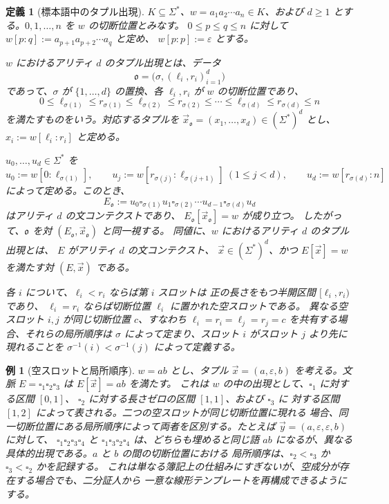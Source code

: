\documentclass[11pt,a4paper]{ltjsarticle}
\newtheorem{definition}[theorem]{定義}
\newtheorem{example}[theorem]{例}
\theoremstyle{remark}
\newcommand{\tuple}[1]{\vec{#1}}
\newcommand{\blank}{\square}
\newcommand{\eps}{\varepsilon}
\begin{document}
\begin{definition}[標本語中のタプル出現]
\label{def:tuple-occurrence}
\(K\subseteq\Sigma^*\)、\(w=a_1a_2\cdots a_n\in K\)、および
\(d\ge1\) とする。\(0,1,\ldots,n\) を \(w\) の切断位置とみなす。
\(0\le p\le q\le n\) に対して
\(w[p:q]:=a_{p+1}a_{p+2}\cdots a_q\) と定め、
\(w[p:p]:=\eps\) とする。

\(w\) における\emph{アリティ \(d\) のタプル出現}とは、データ
\[
  \mathfrak o=\bigl(\sigma,(\ell_i,r_i)_{i=1}^d\bigr)
\]
であって、\(\sigma\) が \(\{1,\ldots,d\}\) の置換、各
\(\ell_i,r_i\) が \(w\) の切断位置であり、
\[
  0\le \ell_{\sigma(1)}\le r_{\sigma(1)}\le
  \ell_{\sigma(2)}\le r_{\sigma(2)}\le\cdots\le
  \ell_{\sigma(d)}\le r_{\sigma(d)}\le n
\]
を満たすものをいう。対応するタプルを
\(\tuple x_{\mathfrak o}=(x_1,\ldots,x_d)\in(\Sigma^*)^d\) とし、
\(x_i:=w[\ell_i:r_i]\) と定める。

\(u_0,\ldots,u_d\in\Sigma^*\) を
\[
  u_0:=w[0:\ell_{\sigma(1)}],\qquad
  u_j:=w[r_{\sigma(j)}:\ell_{\sigma(j+1)}]\ (1\le j<d),\qquad
  u_d:=w[r_{\sigma(d)}:n]
\]
によって定める。このとき、
\[
  E_{\mathfrak o}:=
  u_0\blank_{\sigma(1)}u_1\blank_{\sigma(2)}\cdots
  u_{d-1}\blank_{\sigma(d)}u_d
\]
はアリティ \(d\) の文コンテクストであり、
\(E_{\mathfrak o}[\tuple x_{\mathfrak o}]=w\) が成り立つ。
したがって、\(\mathfrak o\) を対
\((E_{\mathfrak o},\tuple x_{\mathfrak o})\) と同一視する。
同値に、\(w\) におけるアリティ \(d\) のタプル出現とは、
\(E\) がアリティ \(d\) の文コンテクスト、
\(\tuple x\in(\Sigma^*)^d\)、かつ \(E[\tuple x]=w\) を満たす対
\((E,\tuple x)\) である。

各 \(i\) について、\(\ell_i<r_i\) ならば第 \(i\) スロットは
正の長さをもつ半開区間 \([\ell_i,r_i)\) であり、
\(\ell_i=r_i\) ならば切断位置 \(\ell_i\) に置かれた空スロットである。
異なる空スロット \(i,j\) が同じ切断位置 \(c\)、すなわち
\(\ell_i=r_i=\ell_j=r_j=c\) を共有する場合、それらの局所順序は
\(\sigma\) によって定まり、スロット \(i\) がスロット \(j\) より先に
現れることを \(\sigma^{-1}(i)<\sigma^{-1}(j)\) によって定義する。
\end{definition}

\begin{example}[空スロットと局所順序]
\label{ex:empty-slots}
\(w=ab\) とし、タプル \(\tuple x=(a,\eps,b)\) を考える。文脈
\(E=\blank_1\blank_2\blank_3\) は \(E[\tuple x]=ab\) を満たす。
これは \(w\) の中の出現として、\(\blank_1\) に対する区間 \([0,1]\)、
\(\blank_2\) に対する長さゼロの区間 \([1,1]\)、および \(\blank_3\) に
対する区間 \([1,2]\) によって表される。二つの空スロットが同じ切断位置に現れる
場合、同一切断位置にある局所順序によって両者を区別する。たとえば
\(\tuple y=(a,\eps,\eps,b)\) に対して、
\(\blank_1\blank_2\blank_3\blank_4\) と
\(\blank_1\blank_3\blank_2\blank_4\) は、どちらも埋めると同じ語 \(ab\)
になるが、異なる具体的出現である。\(a\) と \(b\) の間の切断位置における
局所順序は、\(\blank_2<\blank_3\) か \(\blank_3<\blank_2\) かを記録する。
これは単なる簿記上の仕組みにすぎないが、空成分が存在する場合でも、二分証人から
一意な線形テンプレートを再構成できるようにする。
\end{example}
\end{document}

